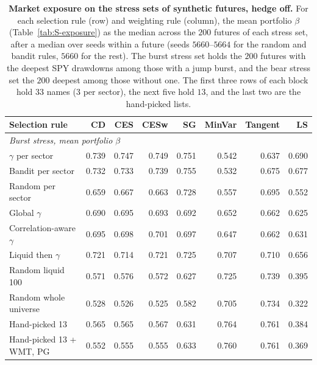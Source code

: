 \begin{table}[H]
\centering
\small
\setlength{\tabcolsep}{4pt}
\caption{\textbf{Market exposure on the stress sets of synthetic futures, hedge off.} For each selection rule (row)
and weighting rule (column), the mean portfolio $\beta$ (Table~\ref{tab:S-exposure}) as the median across the $200$
futures of each stress set, after a median over seeds within a future (seeds $5660$--$5664$ for the random and
bandit rules, $5660$ for the rest). The burst stress set holds the $200$ futures with the deepest SPY drawdowns
among those with a jump burst, and the bear stress set the $200$ deepest among those without one. The first three
rows of each block hold $33$ names ($3$ per sector), the next five hold $13$, and the last two are the hand-picked
lists.}
\label{tab:S-synbeta}
\begin{tabular}{l*{7}{r}}
\toprule
Selection rule & CD & CES & CESw & SG & MinVar & Tangent & LS \\
\midrule
\multicolumn{8}{l}{\emph{Burst stress, mean portfolio $\beta$}} \\
$\gamma$ per sector & 0.739 & 0.747 & 0.749 & 0.751 & 0.542 & 0.637 & 0.690 \\
Bandit per sector & 0.732 & 0.733 & 0.739 & 0.755 & 0.532 & 0.675 & 0.677 \\
Random per sector & 0.659 & 0.667 & 0.663 & 0.728 & 0.557 & 0.695 & 0.552 \\
\addlinespace[2pt]
Global $\gamma$ & 0.690 & 0.695 & 0.693 & 0.692 & 0.652 & 0.662 & 0.625 \\
Correlation-aware $\gamma$ & 0.695 & 0.698 & 0.701 & 0.697 & 0.647 & 0.662 & 0.631 \\
Liquid then $\gamma$ & 0.721 & 0.714 & 0.721 & 0.725 & 0.707 & 0.710 & 0.656 \\
Random liquid 100 & 0.571 & 0.576 & 0.572 & 0.627 & 0.725 & 0.739 & 0.395 \\
Random whole universe & 0.528 & 0.526 & 0.525 & 0.582 & 0.705 & 0.734 & 0.322 \\
\addlinespace[2pt]
Hand-picked 13 & 0.565 & 0.565 & 0.567 & 0.631 & 0.764 & 0.761 & 0.384 \\
Hand-picked 13 + WMT, PG & 0.552 & 0.555 & 0.555 & 0.633 & 0.760 & 0.761 & 0.369 \\

\end{tabular}
\end{table}
